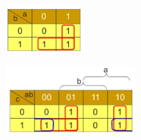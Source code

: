 \begin{minipage}{.4\textwidth}
	\centering
	\includegraphics[width=3cm]{figures/ch13/karnaugh1.jpg}
	\label{fig:karnaugh1}
\end{minipage}%
\begin{minipage}{.5\textwidth}
	\centering
	\includegraphics[width=5cm]{figures/ch13/karnaugh2.jpg}
	\label{fig:karnaugh2}
\end{minipage}

